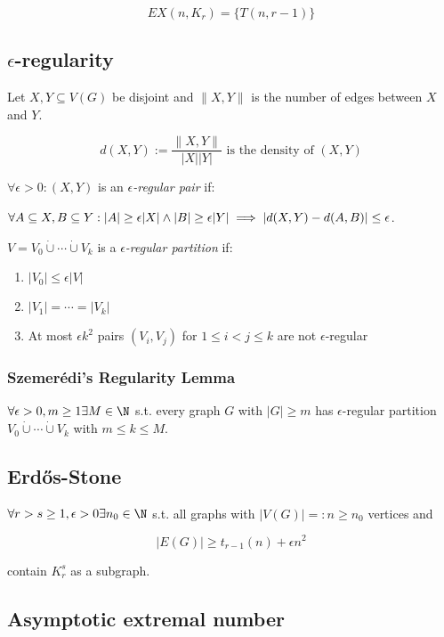 \[ EX(n,K_r) = \{T(n,r-1)\} \]

\subsection*{$\epsilon$-regularity}

Let $X, Y \subseteq V(G)$ be disjoint and $\|X,Y\|$ is the number of edges between $X$ and $Y$.

\[ d(X,Y) := \frac{\|X,Y\|}{|X||Y|} \text{ is the density of $(X, Y)$} \]

$\forall \epsilon > 0 : (X,Y)$ is an \emph{$\epsilon$-regular pair} if:

$\forall A \subseteq X, B \subseteq Y : \\ |A| \geq \epsilon|X| \land |B| \geq \epsilon|Y| \implies |d(X,Y) - d(A,B)| \leq \epsilon$.

\spacing

$V=V_0 \dot\cup\cdots\dot\cup V_k$ is a \emph{$\epsilon$-regular partition} if:

\begin{enumerate}
	\item $|V_0| \leq \epsilon|V|$
	\item $|V_1| = \cdots = |V_k|$
	\item At most $\epsilon k^2$ pairs $(V_i,V_j)$ for $1 \leq i < j \leq k$ are not $\epsilon$-regular
\end{enumerate}

\subsubsection*{Szemer\'{e}di's Regularity Lemma}

$\forall \epsilon > 0, m \geq 1 \exists M \in \N$ s.t. every graph $G$ with $|G| \geq m$ has $\epsilon$-regular partition $V_0 \dot\cup\cdots\dot\cup V_k$ with $m \leq k \leq M$.

\subsection*{Erd\H{o}s-Stone}

$\forall r > s \geq 1, \epsilon > 0 \exists n_0 \in \N$ s.t. all graphs with $|V(G)| =: n \geq n_0$ vertices and

\vspace*{-2mm}
\[ |E(G)| \geq t_{r-1}(n)+\epsilon n^2 \]

contain $K_r^s$ as a subgraph.

\subsection*{Asymptotic extremal number}


